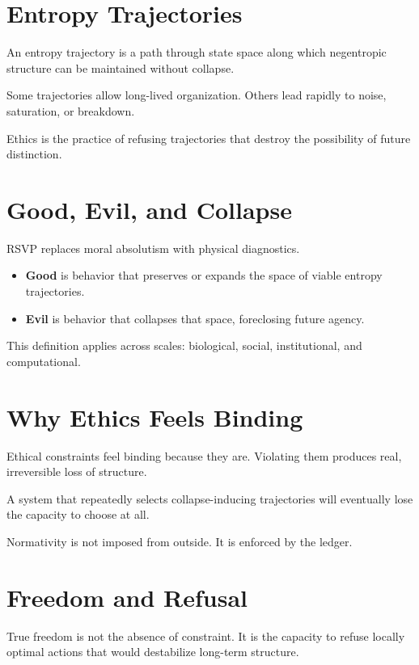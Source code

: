 \documentclass[11pt]{book}
\begin{document}
\section{Entropy Trajectories}

An entropy trajectory is a path through state space along which negentropic structure can be maintained without collapse.

Some trajectories allow long-lived organization. Others lead rapidly to noise, saturation, or breakdown.

Ethics is the practice of refusing trajectories that destroy the possibility of future distinction.

\section{Good, Evil, and Collapse}

RSVP replaces moral absolutism with physical diagnostics.

\begin{itemize}
\item \textbf{Good} is behavior that preserves or expands the space of viable entropy trajectories.
\item \textbf{Evil} is behavior that collapses that space, foreclosing future agency.
\end{itemize}

This definition applies across scales: biological, social, institutional, and computational.

\section{Why Ethics Feels Binding}

Ethical constraints feel binding because they are. Violating them produces real, irreversible loss of structure.

A system that repeatedly selects collapse-inducing trajectories will eventually lose the capacity to choose at all.

Normativity is not imposed from outside. It is enforced by the ledger.

\section{Freedom and Refusal}

True freedom is not the absence of constraint. It is the capacity to refuse locally optimal actions that would destabilize long-term structure.
\end{document}
